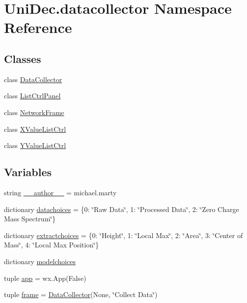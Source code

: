 \hypertarget{namespace_uni_dec_1_1datacollector}{}\section{Uni\+Dec.\+datacollector Namespace Reference}
\label{namespace_uni_dec_1_1datacollector}
\subsection*{Classes}
\begin{DoxyCompactItemize}
\item 
class \hyperlink{class_uni_dec_1_1datacollector_1_1_data_collector}{Data\+Collector}
\item 
class \hyperlink{class_uni_dec_1_1datacollector_1_1_list_ctrl_panel}{List\+Ctrl\+Panel}
\item 
class \hyperlink{class_uni_dec_1_1datacollector_1_1_network_frame}{Network\+Frame}
\item 
class \hyperlink{class_uni_dec_1_1datacollector_1_1_x_value_list_ctrl}{X\+Value\+List\+Ctrl}
\item 
class \hyperlink{class_uni_dec_1_1datacollector_1_1_y_value_list_ctrl}{Y\+Value\+List\+Ctrl}
\end{DoxyCompactItemize}
\subsection*{Variables}
\begin{DoxyCompactItemize}
\item 
string \hyperlink{namespace_uni_dec_1_1datacollector_aef7e269d4e2152f26232e3bd224edf44}{\+\_\+\+\_\+author\+\_\+\+\_\+} = \textquotesingle{}michael.\+marty\textquotesingle{}
\item 
dictionary \hyperlink{namespace_uni_dec_1_1datacollector_a60c587f046c04675d27a6e2401fabe41}{datachoices} = \{0\+: \char`\"{}Raw Data\char`\"{}, 1\+: \char`\"{}Processed Data\char`\"{}, 2\+: \char`\"{}Zero Charge Mass Spectrum\char`\"{}\}
\item 
dictionary \hyperlink{namespace_uni_dec_1_1datacollector_a87b13d28a08d0bf8f12aa57b70d76d1b}{extractchoices} = \{0\+: \char`\"{}Height\char`\"{}, 1\+: \char`\"{}Local Max\char`\"{}, 2\+: \char`\"{}Area\char`\"{}, 3\+: \char`\"{}Center of Mass\char`\"{}, 4\+: \char`\"{}Local Max Position\char`\"{}\}
\item 
dictionary \hyperlink{namespace_uni_dec_1_1datacollector_a3374d5aee476c8e1ce9042c14b94273d}{modelchoices}
\item 
tuple \hyperlink{namespace_uni_dec_1_1datacollector_acea9d885cce1d9b9d2c89e6649a1d381}{app} = wx.\+App(False)
\item 
tuple \hyperlink{namespace_uni_dec_1_1datacollector_aec857f9315b3a9f7c5e344eb0fbdbf16}{frame} = \hyperlink{class_uni_dec_1_1datacollector_1_1_data_collector}{Data\+Collector}(None, \char`\"{}Collect Data\char`\"{})
\end{DoxyCompactItemize}



